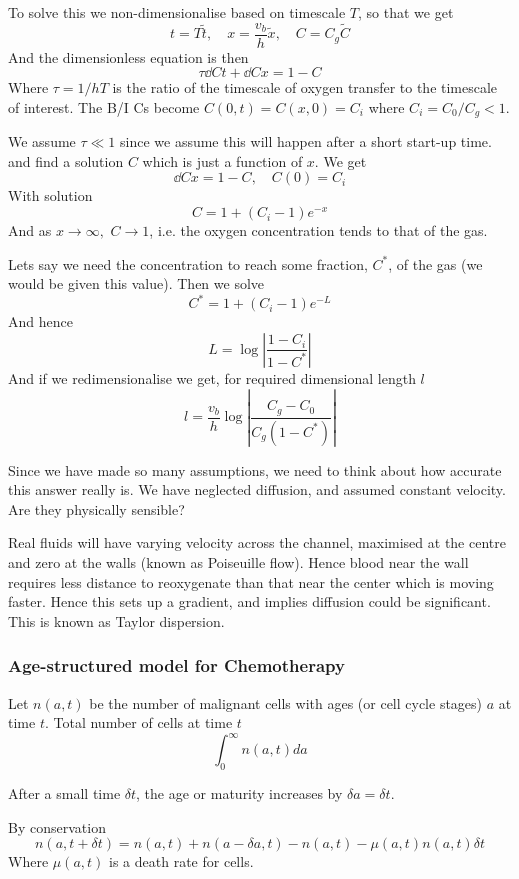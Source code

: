 \documentclass{X:/Documents/Coding/Latex/myassignment}
\begin{document}
To solve this we non-dimensionalise based on timescale $T$, so that we get
\[t = T\tilde t,\quad x = \frac{v_b}{h} \tilde x,\quad C = C_g \tilde C\]
And the dimensionless equation is then
\[\tau \dd Ct + \dd Cx = 1-C\]
Where $\tau = 1/hT$ is the ratio of the timescale of oxygen transfer to the timescale of interest. The B/I Cs become $C(0,t) = C(x,0) = C_i$ where $C_i = C_0/C_g <1$.

We assume $\tau \ll 1$ since we assume this will happen after a short start-up time.
and find a solution $C$ which is just a function of $x$. We get
\[\dd Cx = 1 -C ,\quad C(0) = C_i\]
With solution
\[C = 1+ (C_i -1)e^{-x}\]
And as $x\to\infty,$ $C \to 1$, i.e. the oxygen concentration tends to that of the gas.

Lets say we need the concentration to reach some fraction, $C^*$, of the gas (we would be given this value). Then we solve
\[C^* = 1 + (C_i -1)e^{-L}\]
And hence
\[L = \log\left|\frac{1 - C_i}{1-C^*}\right|\]
And if we redimensionalise we get, for required dimensional length $l$
\[l = \frac{v_b}{h} \log \left|\frac{C_g - C_0}{C_g (1-C^*)}\right|\]

Since we have made so many assumptions, we need to think about how accurate this answer really is. We have neglected diffusion, and assumed constant velocity. Are they physically sensible?

Real fluids will have varying velocity across the channel, maximised at the centre and zero at the walls (known as Poiseuille flow). Hence blood near the wall requires less distance to reoxygenate than that near the center which is moving faster. Hence this sets up a gradient, and implies diffusion could be significant. This is known as Taylor dispersion.

\subsubsection{Age-structured model for Chemotherapy}

Let $n(a,t)$ be the number of malignant cells with ages (or cell cycle stages) $a$ at time $t$. 
Total number of cells at time $t$
\[\int_0^\infty n(a,t) da\]

After a small time $\delta t$, the age or maturity increases by $\delta a = \delta t$.

By conservation
\[n(a, t+ \delta t) = n(a,t) + n(a- \delta a,t ) - n(a,t) - \mu(a,t) n(a,t) \delta t\]
Where $\mu(a,t)$ is a death rate for cells.
\end{document}
